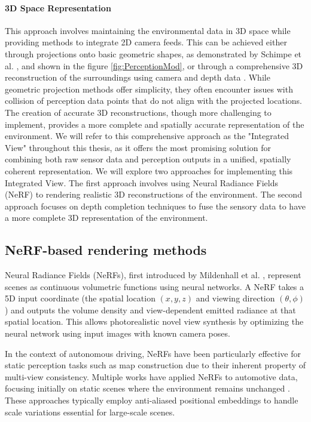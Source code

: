 \paragraph{3D Space Representation} This approach involves maintaining the environmental
data in 3D space while providing methods to integrate 2D camera feeds. This can be
achieved either through projections onto basic geometric shapes, as demonstrated by
Schimpe et al. \cite{Schimpe}, and shown in the figure \ref{fig:PerceptionMod}, or through a comprehensive 3D reconstruction of the surroundings using camera and depth data
. While geometric projection methods offer simplicity, they often encounter issues with collision of perception data points
that do not align with the projected locations. The creation of accurate 3D reconstructions, though more challenging to implement,
provides a more complete and spatially accurate representation of the environment. We will refer to this
comprehensive approach as the "Integrated View" throughout this thesis, as it offers the most promising solution for
combining both raw sensor data and perception outputs in a unified, spatially coherent representation. We will explore
two approaches for implementing this Integrated View. The first approach involves using Neural Radiance Fields (NeRF) to rendering
realistic 3D reconstructions of the environment. The second approach focuses on depth completion techniques to fuse the sensory data
to have a more complete 3D representation of the environment.

\subsection{NeRF-based rendering methods}
Neural Radiance Fields (NeRFs), first introduced by Mildenhall et al. \cite{mildenhall2020nerf}, represent scenes as continuous volumetric functions using neural networks. A NeRF takes a 5D input coordinate (the spatial location $(x,y,z)$ and viewing direction $(\theta,\phi)$) and outputs the volume density and view-dependent emitted radiance at that spatial location. This allows photorealistic novel view synthesis by optimizing the neural network using input images with known camera poses.

In the context of autonomous driving, NeRFs have been particularly effective for static perception tasks such as map construction due to their inherent property of multi-view consistency. Multiple works have applied NeRFs to automotive data, focusing initially on static scenes where the environment remains unchanged \cite{snerf2023}. These approaches typically employ anti-aliased positional embeddings to handle scale variations essential for large-scale scenes.

